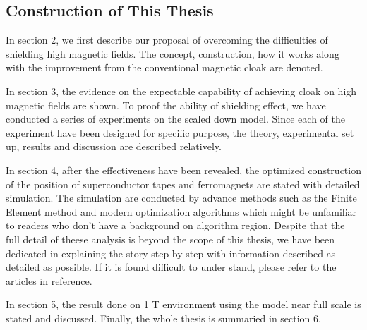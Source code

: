 \newpage
\subsection{Construction of This Thesis}
In section 2, we first describe our proposal of overcoming the difficulties of shielding high magnetic fields.
The concept, construction, how it works along with the improvement from the conventional magnetic cloak are denoted.

In section 3, the evidence on the expectable capability of achieving cloak on high magnetic fields are shown.
To proof the ability of shielding effect,
we have conducted a series of experiments on the scaled down model.
Since each of the experiment have been designed for specific purpose,
the theory, experimental set up, results and discussion are described relatively.

In section 4, after the effectiveness have been revealed, the optimized construction of the position of superconductor tapes and ferromagnets are stated with detailed simulation.
The simulation are conducted by advance methods such as the Finite Element method and modern optimization algorithms which might be unfamiliar to readers who don't have a background on algorithm region.
Despite that the full detail of theese analysis is beyond the scope of this thesis,
we have been dedicated in explaining the story step by step with information described as detailed as possible.
If it is found difficult to under stand, please refer to the articles in reference.

In section 5, the result done on 1 T environment using the model near full scale is stated and discussed.
Finally, the whole thesis is summaried in section 6.


